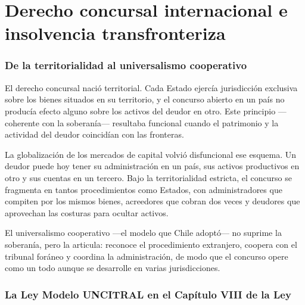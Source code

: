 \chapter{Derecho concursal internacional e insolvencia transfronteriza}
\label{cap:transfronteriza}


\bloqueTeorico

\subsection{De la territorialidad al universalismo cooperativo}

El derecho concursal nació territorial. Cada Estado ejercía jurisdicción exclusiva sobre los
bienes situados en su territorio, y el concurso abierto en un país no producía efecto alguno
sobre los activos del deudor en otro. Este principio ---coherente con la soberanía--- resultaba
funcional cuando el patrimonio y la actividad del deudor coincidían con las fronteras.

La globalización de los mercados de capital volvió disfuncional ese esquema. Un deudor puede
hoy tener su administración en un país, sus activos productivos en otro y sus cuentas en un
tercero. Bajo la territorialidad estricta, el concurso se fragmenta en tantos procedimientos
como Estados, con administradores que compiten por los mismos bienes, acreedores que cobran
dos veces y deudores que aprovechan las costuras para ocultar activos.

El universalismo cooperativo ---el modelo que Chile adoptó--- no suprime la soberanía, pero la
articula: reconoce el procedimiento extranjero, coopera con el tribunal foráneo y coordina la
administración, de modo que el concurso opere como un todo aunque se desarrolle en varias
jurisdicciones.

\subsection{La Ley Modelo UNCITRAL en el Capítulo VIII de la Ley }

